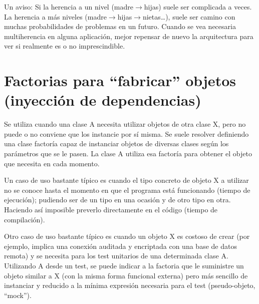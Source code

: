 \documentclass[spanish,12pt,a4paper,final,oneside]{book}
\begin{document}
Un aviso: Si la herencia a un nivel (madre$\rightarrow$hijas) suele ser complicada a veces. La herencia a más niveles (madre$\rightarrow$hijas$ \rightarrow$nietas\ldots), suele ser camino con muchas probabilidades de problemas en un futuro. Cuando se vea necesaria multiherencia en alguna aplicación, mejor repensar de nuevo la arquitectura para ver si realmente es o no imprescindible.

\section{Factorias para ``fabricar'' objetos (inyección de dependencias)}
Se utiliza cuando una clase A necesita utilizar objetos de otra clase X, pero no puede o no conviene que los instancie por sí misma. Se suele resolver definiendo una clase factoría capaz de instanciar objetos de diversas clases según los parámetros que se le pasen. La clase A utiliza esa factoría para obtener el objeto que necesita en cada momento.

Un caso de uso bastante típico es cuando el tipo concreto de objeto X a utilizar no se conoce hasta el momento en que el programa está funcionando (tiempo de ejecución); pudiendo ser de un tipo en una ocasión y de otro tipo en otra. Haciendo así imposible preverlo directamente en el código (tiempo de compilación).

Otro caso de uso bastante típico es cuando un objeto X es costoso de crear (por ejemplo, implica una conexión auditada y encriptada con una base de datos remota) y se necesita para los test unitarios de una determinada clase A. Utilizando A desde un test, se puede indicar a la factoria que le suministre un objeto similar a X (con la misma forma funcional externa) pero más sencillo de instanciar y reducido a la mínima expresión necesaria para el test (pseudo-objeto, ``mock'').
\end{document}
